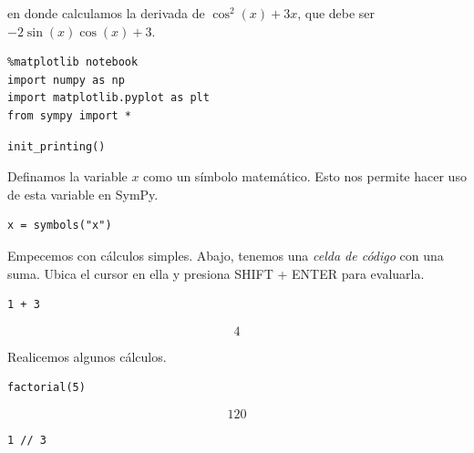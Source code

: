 en donde calculamos la derivada de \(\cos^2(x) + 3x\), que debe ser
\(-2\sin(x)\cos(x) + 3\).

\begin{listing}[H]
\begin{verbatim}
%matplotlib notebook
import numpy as np
import matplotlib.pyplot as plt
from sympy import *
\end{verbatim}
\end{listing}

\begin{listing}[H]
\begin{verbatim}
init_printing()
\end{verbatim}
\end{listing}

Definamos la variable \(x\) como un símbolo matemático. Esto nos permite
hacer uso de esta variable en SymPy.

\begin{listing}[H]
\begin{verbatim}
x = symbols("x")
\end{verbatim}
\end{listing}

Empecemos con cálculos simples. Abajo, tenemos una \emph{celda de
código} con una suma. Ubica el cursor en ella y presiona SHIFT + ENTER
para evaluarla.

\begin{listing}[H]
\begin{verbatim}
1 + 3
\end{verbatim}
\end{listing}

\[4\]

Realicemos algunos cálculos.

\begin{listing}[H]
\begin{verbatim}
factorial(5)
\end{verbatim}
\end{listing}

\[120\]

\begin{listing}[H]
\begin{verbatim}
1 // 3
\end{verbatim}
\end{listing}

